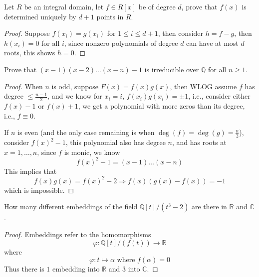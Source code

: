 \documentclass[openany]{book}
\newcommand{\R}{\mathbb{R}}
\newcommand{\C}{\mathbb{C}}
\newcommand{\Q}{\mathbb{Q}}
\begin{document}
\begin{prob}[5.7]
    Let $R$ be an integral domain, let $f\in R[x]$ be of degree $d$, prove that $f(x)$ is determined uniquely by $d+1$ points in $R$.
\end{prob}
\begin{proof}
    Suppose $f(x_i)=g(x_i)$ for $1\leq i\leq d+1$, then consider $h=f-g$, then $h(x_i)=0$ for all $i$, since nonzero polynomials of degree $d$ can have at most $d$ roots, this shows $h=0$.
\end{proof}

\begin{prob}[5.10]
    Prove that $(x-1)(x-2)\dots(x-n)-1$ is irreducible over $\Q$ for all $n\geq 1$.
\end{prob}
\begin{proof}
    When $n$ is odd, suppose $F(x)=f(x)g(x)$, then WLOG assume $f$ has degree $\leq \frac{n-1}{2}$, and we know for $x_i=i$, $f(x_i)g(x_i)=\pm 1$, i.e., consider either $f(x)-1$ or $f(x)+1$, we get a polynomial with more zeros than its degree, i.e., $f\equiv 0$.

    If $n$ is even (and the only case remaining is when $\deg(f)=\deg(g)=\frac{n}{2}$), consider $f(x)^2-1$, this polynomial also has degree $n$, and has roots at $x=1,\dots, n$, since $f$ is monic, we know 
    \begin{equation*}
        f(x)^2-1=(x-1)\dots(x-n)
    \end{equation*}
    This implies that 
    \begin{equation*}
        f(x)g(x)=f(x)^2-2\Rightarrow f(x)(g(x)-f(x))=-1
    \end{equation*}
    which is impossible.
\end{proof}


\begin{prob}[5.14]
    How many different embeddings of the field $\Q[t]/(t^3-2)$ are there in $\R$ and $\C$.
\end{prob}
\begin{proof}
    Embeddings refer to the homomorphisms 
    \begin{equation*}
        \varphi: \Q[t]/(f(t))\to\R
    \end{equation*}
    where 
    \begin{equation*}
        \varphi: t\mapsto \alpha \text{ where } f(\alpha)=0
    \end{equation*}
    Thus there is $1$ embedding into $\R$ and $3$ into $\C$.
\end{proof}
\end{document}

